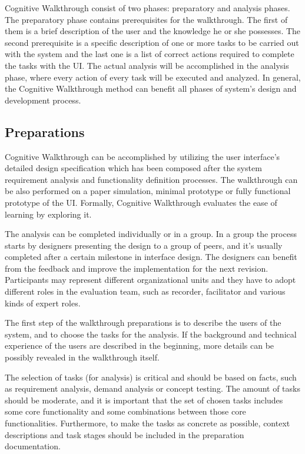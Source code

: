 \documentclass[12pt,a4paper,oneside,pdftex]{report}
\begin{document}
Cognitive Walkthrough consist of two phases: preparatory and analysis phases. The preparatory phase contains prerequisites for the walkthrough. The first of them is a brief description of the user and the knowledge he or she possesses. The second prerequisite is a specific description of one or more tasks to be carried out with the system and the last one is a list of correct actions required to complete the tasks with the UI. The actual analysis will be accomplished in the analysis phase, where every action of every task will be executed and analyzed. In general, the Cognitive Walkthrough method can benefit all phases of system's design and development process.\citep{RefWorks:26, RefWorks:34}

\subsection{Preparations}
Cognitive Walkthrough can be accomplished by utilizing the user interface's detailed design specification which has been composed after the system requirement analysis and functionality definition processes. The walkthrough can be also performed on a paper simulation, minimal prototype or fully functional prototype of the UI. Formally, Cognitive Walkthrough evaluates the ease of learning by exploring it. \citep{RefWorks:26}

The analysis can be completed individually or in a group. In a group the process starts by designers presenting the design to a group of peers, and it's usually completed after a certain milestone in interface design. The designers can benefit from the feedback and improve the implementation for the next revision. Participants may represent different organizational units and they have to adopt different roles in the evaluation team, such as recorder, facilitator and various kinds of expert roles. \citep{RefWorks:26}

The first step of the walkthrough preparations is to describe the users of the system, and to choose the tasks for the analysis. If the background and technical experience of the users are described in the beginning, more details can be possibly revealed in the walkthrough itself. \citep{RefWorks:26}

The selection of tasks (for analysis) is critical and should be based on facts, such as requirement analysis, demand analysis or concept testing. The amount of tasks should be moderate, and it is important that the set of chosen tasks includes some core functionality and some combinations between those core functionalities. Furthermore, to make the tasks as concrete as possible, context descriptions and task stages should be included in the preparation documentation. \citep{RefWorks:26}
\end{document}
